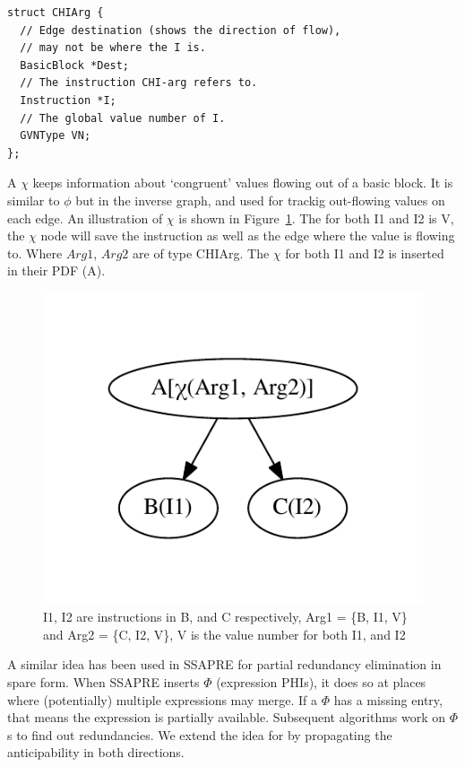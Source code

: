 \documentclass[sigplan,10pt,review,anonymous]{acmart}\settopmatter{printfolios=true,printccs=false,printacmref=false}
\begin{document}
\begin{lstlisting}
struct CHIArg {
  // Edge destination (shows the direction of flow),
  // may not be where the I is.
  BasicBlock *Dest;
  // The instruction CHI-arg refers to.
  Instruction *I;
  // The global value number of I.
  GVNType VN;
};
\end{lstlisting}

A $\chi$ keeps information about `congruent' values flowing out of a basic
block.  It is similar to $\phi$ \cite{ssa} but in the inverse graph, and used
for trackig out-flowing values on each edge. An illustration of $\chi$ is shown
in Figure~\ref{fig:chi-intro}. The \GVN{} for both I1 and I2 is V, the $\chi$
node will save the instruction as well as the edge where the value is flowing
to.  Where $Arg1$, $Arg2$ are of type CHIArg. The $\chi$ for both I1 and I2 is
inserted in their PDF (A).


\begin{figure}
  \includegraphics[scale=0.55]{chi-example.pdf}
  \vspace*{-1.0cm}
\caption{I1, I2 are instructions in B, and C respectively, Arg1 = \{B, I1,
  V\} and Arg2 = \{C, I2, V\}, V is the value number for both I1, and I2}
\label{fig:chi-intro}
\end{figure}

A similar idea has been used in SSAPRE \cite{ssapre} for partial redundancy
elimination in spare form. When SSAPRE inserts $\Phi$ (expression PHIs), it does
so at places where (potentially) multiple expressions may merge. If a $\Phi$ has
a missing entry, that means the expression is partially available. Subsequent
algorithms work on $\Phi$s to find out redundancies. We extend the idea for
\GCM{} by propagating the anticipability in both directions.
\end{document}
